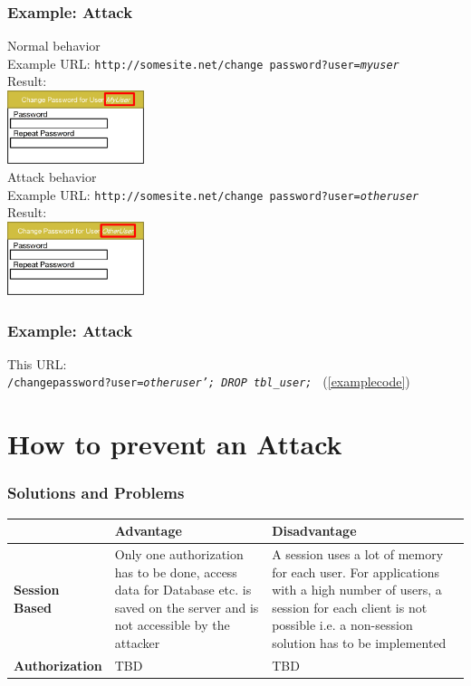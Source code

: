 \documentclass[aspectratio=169]{beamer}
\begin{document}
\begin{frame}
  \frametitle{Example: Attack}
  \begin{multicols}{2}
   \LARGE{Normal behavior}\\\normalsize Example URL: \small\texttt{http://somesite.net/change password?user=\textit{myuser}}\\
   \normalsize{Result:}\\\includegraphics[width=4cm]{example_web_s1}\\
   \LARGE{Attack behavior}\\\normalsize Example URL: \small\texttt{http://somesite.net/change password?user=\textit{otheruser}}\\
   \normalsize{Result:}\\\includegraphics[width=4cm]{example_web_s2}\\
  \end{multicols}
\end{frame}

\begin{frame}
  \frametitle{Example: Attack}
  This URL:\\ \texttt{/changepassword?user=\textit{otheruser'; DROP tbl\_user; }} (\ref{examplecode})
\end{frame}


\section{How to prevent an Attack}

\begin{frame}
  \frametitle{Solutions and Problems}
\tiny
  \begin{tabular}{|l|p{4cm}|p{4cm}|}
    \hline
    & \textbf{Advantage} & \textbf{Disadvantage} \\\hline
    \textbf{Session Based} & Only one authorization has to be done, access data for Database etc. is saved on the server and is not accessible by the attacker & A session uses a lot of memory for each user. For applications with a high number of users, a session for each client is not possible i.e. a non-session solution has to be implemented \\\hline
    \textbf{Authorization} & TBD & TBD\\\hline
  \end{tabular}
\end{frame}
\end{document}
